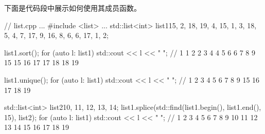 下面是代码段中展示如何使用其成员函数。


\begin{cpp}
// list.cpp
...
#include <list>
...
std::list<int> list1{15, 2, 18, 19, 4, 15, 1, 3, 18, 5,
	                  4, 7, 17, 9, 16, 8, 6, 6, 17, 1, 2};
	                  
list1.sort();
for (auto l: list1) std::cout << l << " ";
	// 1 1 2 2 3 4 4 5 6 6 7 8 9 15 15 16 17 17 18 18 19

list1.unique();
for (auto l: list1) std::cout << l << " ";
	// 1 2 3 4 5 6 7 8 9 15 16 17 18 19

std::list<int> list2{10, 11, 12, 13, 14};
list1.splice(std::find(list1.begin(), list1.end(), 15), list2);
for (auto l: list1) std::cout << l << " ";
	// 1 2 3 4 5 6 7 8 9 10 11 12 13 14 15 16 17 18 19
\end{cpp}


